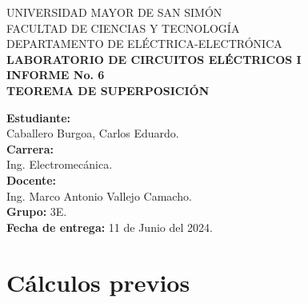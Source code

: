 \documentclass[letter,11pt]{article}
\begin{document}
\begin{titlepage}
    \begin{center}
        {\Large UNIVERSIDAD MAYOR DE SAN SIMÓN}\\
        \vspace*{0.15cm}
        {\large FACULTAD DE CIENCIAS Y TECNOLOGÍA}\\
        \vspace*{0.10cm}
        DEPARTAMENTO DE ELÉCTRICA-ELECTRÓNICA\\
        \vspace*{3.0cm}
        {\Large \textbf{LABORATORIO DE CIRCUITOS ELÉCTRICOS I}}\\
        \vspace*{0.3cm}
        {\Large \textbf{INFORME No. 6}}\\
        \vspace*{3.5cm}
        {\Large \textbf{TEOREMA DE SUPERPOSICIÓN}}\\
    \end{center}

    \vspace*{6.4cm}
    \leftskip=7.95cm
    \noindent
    \textbf{Estudiante:}\\
    Caballero Burgoa, Carlos Eduardo.\\
    \newline
    \textbf{Carrera:}\\
    Ing. Electromecánica.\\
    \newline
    \textbf{Docente:}\\
    Ing. Marco Antonio Vallejo Camacho.\\
    \newline
    \textbf{Grupo:} 3E.\\
    \textbf{Fecha de entrega:} 11 de Junio del 2024.\\
\end{titlepage}

\section{Cálculos previos}
\end{document}
